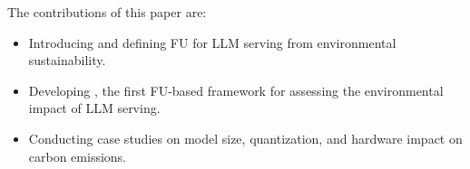 The contributions of this paper are:
\begin{itemize}
    \item Introducing and defining FU for LLM serving from environmental sustainability.  
    \item Developing \SYSTEM{}, the first FU-based framework for assessing the environmental impact of LLM serving.
    \item Conducting case studies on model size, quantization, and hardware impact on carbon emissions.
\end{itemize}

